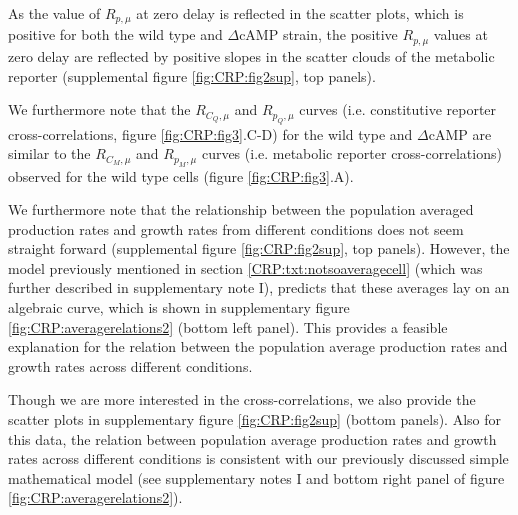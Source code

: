 





As the value of $R_{p,\mu}$ at zero delay is reflected in the scatter plots,
which is positive for both the wild type and $\Delta$cAMP strain,
the positive $R_{p,\mu}$ values at zero delay are reflected by positive slopes in the scatter clouds of the metabolic reporter (supplemental figure \ref{fig:CRP:fig2sup}, top panels).

We furthermore note that the $R_{C_Q,\mu}$ and $R_{p_Q,\mu}$ curves (i.e. constitutive reporter cross-correlations, figure \ref{fig:CRP:fig3}.C-D) for the wild type and $\Delta$cAMP are similar to the 
$R_{C_M,\mu}$ and $R_{p_M,\mu}$ curves (i.e. metabolic reporter cross-correlations) observed for the wild type cells 
(figure \ref{fig:CRP:fig3}.A).


%
%
We furthermore note that the relationship between the population averaged production rates and growth rates from different conditions does not seem straight forward (supplemental figure \ref{fig:CRP:fig2sup}, top panels).
%
However, the model previously mentioned in section \ref{CRP:txt:notsoaveragecell} (which was further described in supplementary note I),
predicts that these averages lay on an algebraic curve, which is shown in supplementary figure \ref{fig:CRP:averagerelations2} (bottom left panel).
%
This provides a feasible explanation for the relation between the population average production rates and growth rates across different conditions.




Though we are more interested in the cross-correlations, we also provide the scatter plots in supplementary figure \ref{fig:CRP:fig2sup} (bottom panels).
Also for this data,
the relation between population average production rates and growth rates across different conditions
is consistent with our previously discussed simple mathematical model (see supplementary notes I and bottom right panel of figure \ref{fig:CRP:averagerelations2}).








